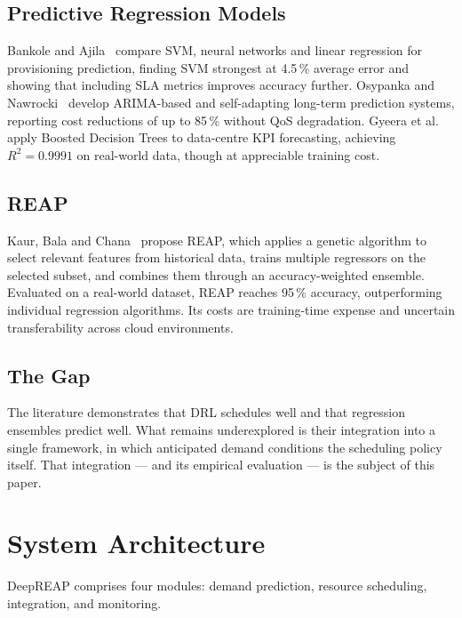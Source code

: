 \documentclass[runningheads]{llncs}
\begin{document}
\subsection{Predictive Regression Models}

Bankole and Ajila~\cite{bankole2013} compare SVM, neural networks and
linear regression for provisioning prediction, finding SVM strongest
at 4.5\,\% average error and showing that including SLA metrics
improves accuracy further. Osypanka and
Nawrocki~\cite{osypanka2022,osypanka2023} develop ARIMA-based and
self-adapting long-term prediction systems, reporting cost reductions
of up to 85\,\% without QoS degradation. Gyeera
et al.~\cite{gyeera2023} apply Boosted Decision Trees to data-centre
KPI forecasting, achieving $R^2 = 0.9991$ on real-world data, though
at appreciable training cost.

\subsection{REAP}

Kaur, Bala and Chana~\cite{kaur2019} propose REAP, which applies a
genetic algorithm to select relevant features from historical data,
trains multiple regressors on the selected subset, and combines them
through an accuracy-weighted ensemble. Evaluated on a real-world
dataset, REAP reaches 95\,\% accuracy, outperforming individual
regression algorithms. Its costs are training-time expense and
uncertain transferability across cloud environments.

\subsection{The Gap}

The literature demonstrates that DRL schedules well and that
regression ensembles predict well. What remains underexplored is their
integration into a single framework, in which anticipated demand
conditions the scheduling policy itself. That integration --- and its
empirical evaluation --- is the subject of this paper.

\section{System Architecture}

DeepREAP comprises four modules: demand prediction, resource
scheduling, integration, and monitoring.
\end{document}
